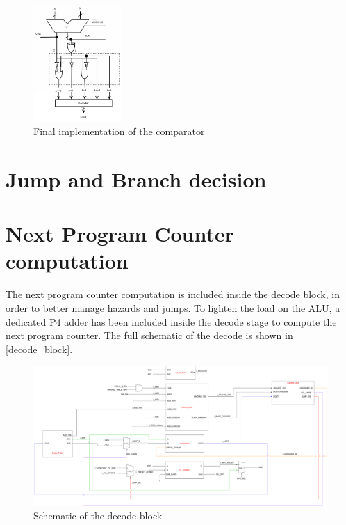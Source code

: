 \begin{figure}[H]
	\centering
	\includegraphics[width=0.3\textwidth]{chapters/4_DecodeStage/images/cmp_final.pdf}
	\caption{Final implementation of the comparator}
	\label{cmp_final}
\end{figure}

\section{Jump and Branch decision}
\section{Next Program Counter computation}
The next program counter computation is included inside the decode block, in order to better manage hazards and jumps. To lighten the load on the ALU, a dedicated P4 adder has been included inside the decode stage to compute the next program counter. 
The full schematic of the decode is shown in \autoref{decode_block}.

\begin{figure}[H]
	\centering
  \addtolength{\leftskip}{-3cm}
  \addtolength{\rightskip}{-3cm}
	\includegraphics[width=1.2\textwidth]{chapters/4_DecodeStage/images/decode_block.pdf}
	\caption{Schematic of the decode block}
	\label{decode_block}
\end{figure}


